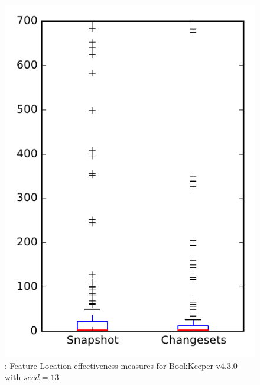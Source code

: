 
\begin{figure}
\centering
\includegraphics[height=0.4\textheight]{figures/flt_seed/rq1_bookkeeper_13}
\caption{\rone: Feature Location effectiveness measures for BookKeeper v4.3.0 with $seed=13$}
\label{fig:flt_seed:rq1:bookkeeper}
\end{figure}
